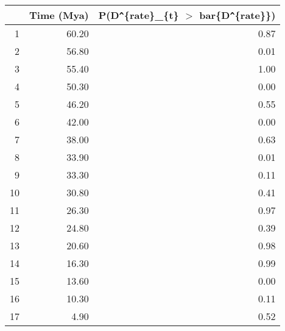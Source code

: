 \begin{table}[ht]
\centering
\begin{tabular}{rrr}
  \hline
 & Time (Mya) & P(D\verb|^|\{rate\}\_\{t\} $>$ bar\{D\verb|^|\{rate\}\}) \\ 
  \hline
1 & 60.20 & 0.87 \\ 
  2 & 56.80 & 0.01 \\ 
  3 & 55.40 & 1.00 \\ 
  4 & 50.30 & 0.00 \\ 
  5 & 46.20 & 0.55 \\ 
  6 & 42.00 & 0.00 \\ 
  7 & 38.00 & 0.63 \\ 
  8 & 33.90 & 0.01 \\ 
  9 & 33.30 & 0.11 \\ 
  10 & 30.80 & 0.41 \\ 
  11 & 26.30 & 0.97 \\ 
  12 & 24.80 & 0.39 \\ 
  13 & 20.60 & 0.98 \\ 
  14 & 16.30 & 0.99 \\ 
  15 & 13.60 & 0.00 \\ 
  16 & 10.30 & 0.11 \\ 
  17 & 4.90 & 0.52 \\ 
   \hline
\end{tabular}
\label{tab:rate_peak}
\end{table}
